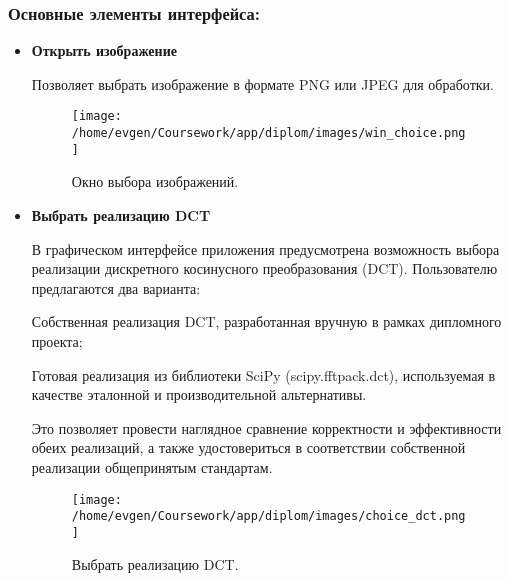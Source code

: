 \subsubsection{Основные элементы интерфейса:}

\begin{itemize}
    \item \textbf{Открыть изображение}

    Позволяет выбрать изображение в формате PNG или JPEG для обработки.
    
    \begin{figure}[h!]
        \centering
        \texttt{[image: /home/evgen/Coursework/app/diplom/images/win\_choice.png]}
        \caption{Окно выбора изображений.}
        \label{fig:win_choice}
    \end{figure}



    \item \textbf{Выбрать реализацию DCT}

    В графическом интерфейсе приложения предусмотрена возможность выбора реализации дискретного косинусного преобразования (DCT). 
    Пользователю предлагаются два варианта:

    Собственная реализация DCT, разработанная вручную в рамках дипломного проекта;
    
    Готовая реализация из библиотеки SciPy (scipy.fftpack.dct), используемая в качестве эталонной и производительной альтернативы.
    
    Это позволяет провести наглядное сравнение корректности и эффективности обеих реализаций, а также удостовериться в соответствии собственной реализации общепринятым стандартам.

    \begin{figure}[h!]
        \centering
        \texttt{[image: /home/evgen/Coursework/app/diplom/images/choice\_dct.png]}
        \caption{Выбрать реализацию DCT.}
        \label{fig:choice_dct}
    \end{figure}





\end{itemize}










